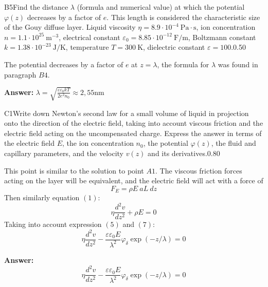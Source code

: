 \documentclass[11pt,a4paper]{article}
\begin{document}
\begin{solcard}{B5}{Find the distance $\lambda$ (formula and numerical value) at which the potential $\varphi(z)$ decreases by a factor of $e$. This length is considered the characteristic size of the Gouy diffuse layer. Liquid viscosity $\eta = 8.9 \cdot 10^{-4}~\text{Pa} \cdot \text{s} $, ion concentration $n = 1.1 \cdot 10^{25}~\text{m}^{-3}$, electrical constant $\varepsilon_0 = 8.85 \cdot 10^{-12} ~\text{F}/ \text{m}$, Boltzmann constant $k = 1.38 \cdot 10^{-23}~\text{J}/\text{K}$, temperature $T = 300~\text{K}$, dielectric constant $\varepsilon = 100$.}{0.50}

The potential decreases by a factor of $e$ at $z = \lambda$, the formula for $\lambda$ was found in paragraph $B4$.

\par\smallskip\noindent\textbf{Answer:} $\lambda = \sqrt{\tfrac{\varepsilon \varepsilon_0 kT}{2e^2 n_0}} \approx 2,55 \mathrm{nm}$
\end{solcard}

\begin{solcard}{C1}{Write down Newton's second law for a small volume of liquid in projection onto the direction of the electric field, taking into account viscous friction and the electric field acting on the uncompensated charge.  Express the answer in terms of the electric field $E$, the ion concentration $n_0$, the potential $\varphi(z)$, the fluid and capillary parameters, and the velocity $v(z)$ and its derivatives.}{0.80}

This point is similar to the solution to point $A1$. The viscous friction forces acting on the layer will be equivalent, and the electric field will act with a force of $$ F_E = \rho E\: aL \: dz $$ Then similarly equation $(1)$: $$ \eta\frac{d^2v}{dz^2} + \rho E = 0 $$ Taking into account expression $(5)$ and $(7)$: $$ \eta \frac{d^2 v}{dz^2} -  \frac{\varepsilon \varepsilon_0 E}{\lambda^2} \varphi_\delta \exp \left( - z/\lambda \right)= 0 $$

\par\smallskip\noindent\textbf{Answer:} $$ \eta \frac{d^2 v}{dz^2} -  \frac{\varepsilon \varepsilon_0 E}{\lambda^2} \varphi_\delta \exp \left( - z/\lambda \right)= 0 $$
\end{solcard}
\end{document}
